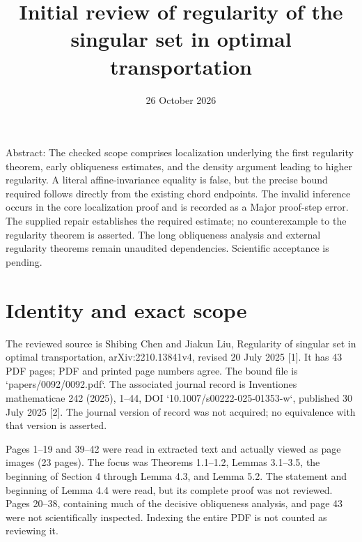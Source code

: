 \documentclass[10pt]{article}
\title{Initial review of regularity of the singular set in optimal transportation}
\author{}
\date{26 October 2026}
\begin{document}
\maketitle
Abstract: The checked scope comprises localization underlying the first regularity theorem, early obliqueness estimates, and the density argument leading to higher regularity. A literal affine-invariance equality is false, but the precise bound required follows directly from the existing chord endpoints. The invalid inference occurs in the core localization proof and is recorded as a Major proof-step error. The supplied repair establishes the required estimate; no counterexample to the regularity theorem is asserted. The long obliqueness analysis and external regularity theorems remain unaudited dependencies. Scientific acceptance is pending.\par
\section*{Identity and exact scope}
The reviewed source is Shibing Chen and Jiakun Liu, Regularity of singular set in optimal transportation, arXiv:2210.13841v4, revised 20 July 2025 [1]. It has 43 PDF pages; PDF and printed page numbers agree. The bound file is `papers/0092/0092.pdf`. The associated journal record is Inventiones mathematicae 242 (2025), 1–44, DOI `10.1007/s00222-025-01353-w`, published 30 July 2025 [2]. The journal version of record was not acquired; no equivalence with that version is asserted.\par
Pages 1–19 and 39–42 were read in extracted text and actually viewed as page images (23 pages). The focus was Theorems 1.1–1.2, Lemmas 3.1–3.5, the beginning of Section 4 through Lemma 4.3, and Lemma 5.2. The statement and beginning of Lemma 4.4 were read, but its complete proof was not reviewed. Pages 20–38, containing much of the decisive obliqueness analysis, and page 43 were not scientifically inspected. Indexing the entire PDF is not counted as reviewing it.\par
\end{document}
